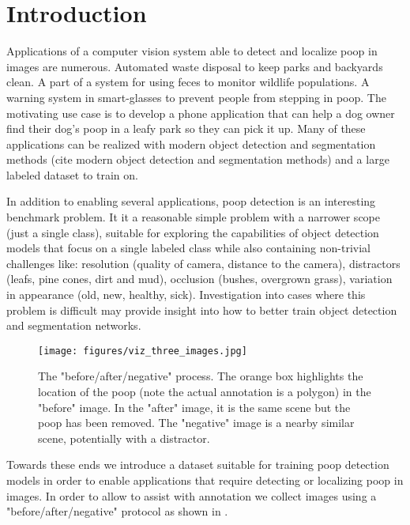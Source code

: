 \documentclass[10pt,twocolumn,letterpaper]{article}
\begin{document}
\section{Introduction}
\label{sec:intro}

Applications of a computer vision system able to detect and localize poop in
images are numerous.
Automated waste disposal to keep parks and backyards clean.
A part of a system for using feces to monitor wildlife populations.
A warning system in smart-glasses to prevent people from stepping in poop.
The motivating use case is to develop a phone application that can help a dog
owner find their dog's poop in a leafy park so they can pick it up.
Many of these applications can be realized with modern object detection and
segmentation methods (cite modern object detection and segmentation methods)
and a large labeled dataset to train on.


In addition to enabling several applications, poop detection is an interesting benchmark problem. 
It it a reasonable simple problem with a narrower scope (just a single class),
suitable for exploring the capabilities of object detection models that focus
on a single labeled class while also containing non-trivial challenges like:
resolution (quality of camera, distance to the camera),
distractors (leafs, pine cones, dirt and mud),
occlusion (bushes, overgrown grass),
variation in appearance (old, new, healthy, sick).
Investigation into cases where this problem is difficult may provide insight
into how to better train object detection and segmentation networks.


\begin{figure}[h]
\centering
\texttt{[image: figures/viz\_three\_images.jpg]}
\caption[]{
    The "before/after/negative" process.
    The orange box highlights the location of the poop (note the
    actual annotation is a polygon) in the "before" image.
    In the "after" image, it is the same scene but the poop has been removed.
    The "negative" image is a nearby similar scene, potentially with a distractor.
}
\label{fig:ThreeImages}
\end{figure}

Towards these ends we introduce a dataset suitable for training poop detection
models in order to enable applications that require detecting or localizing
poop in images. In order to allow to assist with annotation we collect images
using a "before/after/negative" protocol as shown in . 
\end{document}
